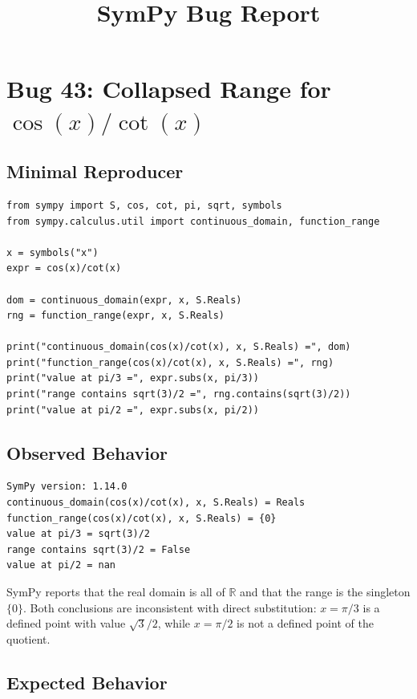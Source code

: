 \documentclass[11pt]{article}
\title{SymPy Bug Report}
\author{}
\date{}
\begin{document}
\maketitle

\section{Bug 43: Collapsed Range for \texorpdfstring{$\cos(x)/\cot(x)$}{cos(x)/cot(x)}}

\subsection{Minimal Reproducer}

\medskip

\begin{lstlisting}[style=bugpython]
from sympy import S, cos, cot, pi, sqrt, symbols
from sympy.calculus.util import continuous_domain, function_range

x = symbols("x")
expr = cos(x)/cot(x)

dom = continuous_domain(expr, x, S.Reals)
rng = function_range(expr, x, S.Reals)

print("continuous_domain(cos(x)/cot(x), x, S.Reals) =", dom)
print("function_range(cos(x)/cot(x), x, S.Reals) =", rng)
print("value at pi/3 =", expr.subs(x, pi/3))
print("range contains sqrt(3)/2 =", rng.contains(sqrt(3)/2))
print("value at pi/2 =", expr.subs(x, pi/2))
\end{lstlisting}

\subsection{Observed Behavior}

\medskip

\begin{lstlisting}[style=bugpython]
SymPy version: 1.14.0
continuous_domain(cos(x)/cot(x), x, S.Reals) = Reals
function_range(cos(x)/cot(x), x, S.Reals) = {0}
value at pi/3 = sqrt(3)/2
range contains sqrt(3)/2 = False
value at pi/2 = nan
\end{lstlisting}

SymPy reports that the real domain is all of \(\mathbb{R}\) and that the range is the singleton \(\{0\}\). Both conclusions are inconsistent with direct substitution: \(x=\pi/3\) is a defined point with value \(\sqrt{3}/2\), while \(x=\pi/2\) is not a defined point of the quotient.

\subsection{Expected Behavior}
\end{document}

